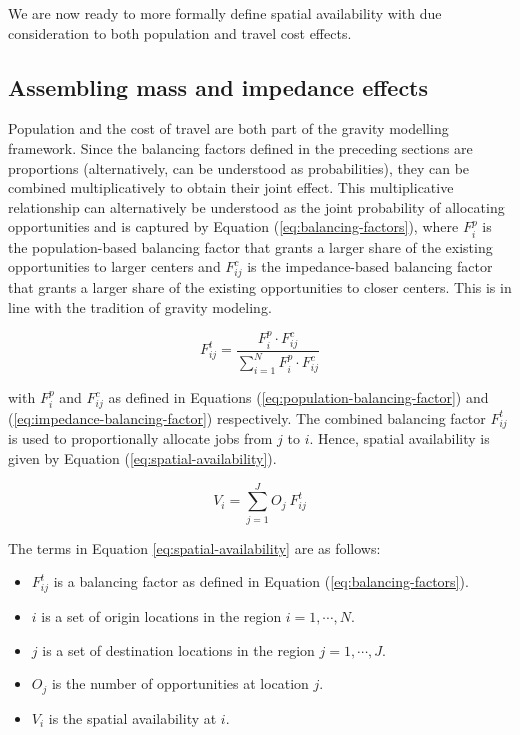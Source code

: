 \documentclass[]{elsarticle} %
\providecommand{\tightlist}{%
  \setlength{\itemsep}{0pt}\setlength{\parskip}{0pt}}
\begin{document}
We are now ready to more formally define spatial availability with due
consideration to both population and travel cost effects.

\hypertarget{assembling-mass-and-impedance-effects}{%
\subsection{Assembling mass and impedance
effects}\label{assembling-mass-and-impedance-effects}}

Population and the cost of travel are both part of the gravity modelling
framework. Since the balancing factors defined in the preceding sections
are proportions (alternatively, can be understood as probabilities),
they can be combined multiplicatively to obtain their joint effect. This
multiplicative relationship can alternatively be understood as the joint
probability of allocating opportunities and is captured by Equation
(\ref{eq:balancing-factors}), where \(F^p_{i}\) is the population-based
balancing factor that grants a larger share of the existing
opportunities to larger centers and \(F^c_{ij}\) is the impedance-based
balancing factor that grants a larger share of the existing
opportunities to closer centers. This is in line with the tradition of
gravity modeling.

\begin{equation}
\label{eq:balancing-factors}
F^t_{ij} = \frac{F^p_{i} \cdot F^c_{ij}}{\sum_{i=1}^N F^p_{i} \cdot F^c_{ij}}
\end{equation}

\noindent with \(F^p_{i}\) and \(F^c_{ij}\) as defined in Equations
(\ref{eq:population-balancing-factor}) and
(\ref{eq:impedance-balancing-factor}) respectively. The combined
balancing factor \(F^t_{ij}\) is used to proportionally allocate jobs
from \(j\) to \(i\). Hence, spatial availability is given by Equation
(\ref{eq:spatial-availability}).

\begin{equation}
\label{eq:spatial-availability}
V_{i} = \sum_{j=1}^J O_j\ F^t_{ij}
\end{equation}

The terms in Equation \ref{eq:spatial-availability} are as follows:

\begin{itemize}
\tightlist
\item
  \(F^t_{ij}\) is a balancing factor as defined in Equation
  (\ref{eq:balancing-factors}).
\item
  \(i\) is a set of origin locations in the region \(i = 1,\cdots, N\).
\item
  \(j\) is a set of destination locations in the region
  \(j = 1,\cdots,J\).
\item
  \(O_j\) is the number of opportunities at location \(j\).
\item
  \(V_{i}\) is the spatial availability at \(i\).
\end{itemize}
\end{document}
